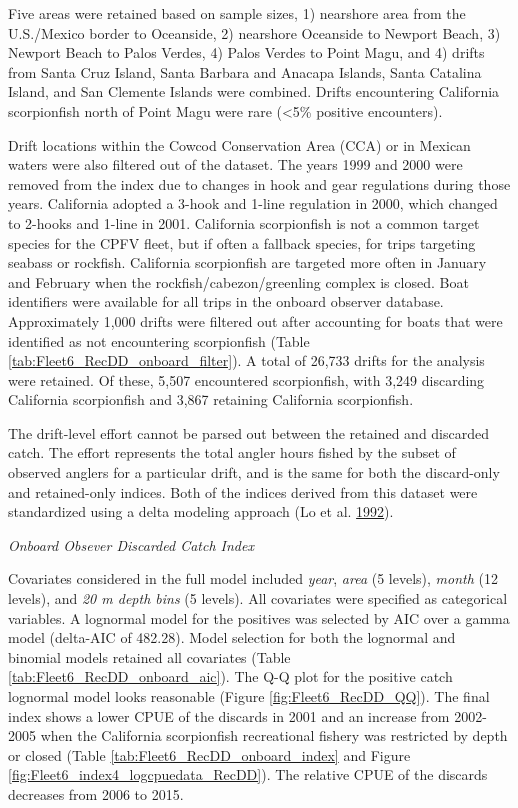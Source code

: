 \documentclass[12pt,]{article}
\begin{document}
Five areas were retained based on sample sizes, 1) nearshore area from
the U.S./Mexico border to Oceanside, 2) nearshore Oceanside to Newport
Beach, 3) Newport Beach to Palos Verdes, 4) Palos Verdes to Point Magu,
and 4) drifts from Santa Cruz Island, Santa Barbara and Anacapa Islands,
Santa Catalina Island, and San Clemente Islands were combined. Drifts
encountering California scorpionfish north of Point Magu were rare
(\textless{}5\% positive encounters).

Drift locations within the Cowcod Conservation Area (CCA) or in Mexican
waters were also filtered out of the dataset. The years 1999 and 2000
were removed from the index due to changes in hook and gear regulations
during those years. California adopted a 3-hook and 1-line regulation in
2000, which changed to 2-hooks and 1-line in 2001. California
scorpionfish is not a common target species for the CPFV fleet, but if
often a fallback species, for trips targeting seabass or rockfish.
California scorpionfish are targeted more often in January and February
when the rockfish/cabezon/greenling complex is closed. Boat identifiers
were available for all trips in the onboard observer database.
Approximately 1,000 drifts were filtered out after accounting for boats
that were identified as not encountering scorpionfish (Table
\ref{tab:Fleet6_RecDD_onboard_filter}). A total of 26,733 drifts for the
analysis were retained. Of these, 5,507 encountered scorpionfish, with
3,249 discarding California scorpionfish and 3,867 retaining California
scorpionfish.

The drift-level effort cannot be parsed out between the retained and
discarded catch. The effort represents the total angler hours fished by
the subset of observed anglers for a particular drift, and is the same
for both the discard-only and retained-only indices. Both of the indices
derived from this dataset were standardized using a delta modeling
approach (Lo et al. \protect\hyperlink{ref-Lo1992}{1992}).

\emph{Onboard Obsever Discarded Catch Index}

Covariates considered in the full model included \emph{year},
\emph{area} (5 levels), \emph{month} (12 levels), and \emph{20 m depth
bins} (5 levels). All covariates were specified as categorical
variables. A lognormal model for the positives was selected by AIC over
a gamma model (delta-AIC of 482.28). Model selection for both the
lognormal and binomial models retained all covariates (Table
\ref{tab:Fleet6_RecDD_onboard_aic}). The Q-Q plot for the positive catch
lognormal model looks reasonable (Figure \ref{fig:Fleet6_RecDD_QQ}). The
final index shows a lower CPUE of the discards in 2001 and an increase
from 2002-2005 when the California scorpionfish recreational fishery was
restricted by depth or closed (Table
\ref{tab:Fleet6_RecDD_onboard_index} and Figure
\ref{fig:Fleet6_index4_logcpuedata_RecDD}). The relative CPUE of the
discards decreases from 2006 to 2015.
\end{document}
